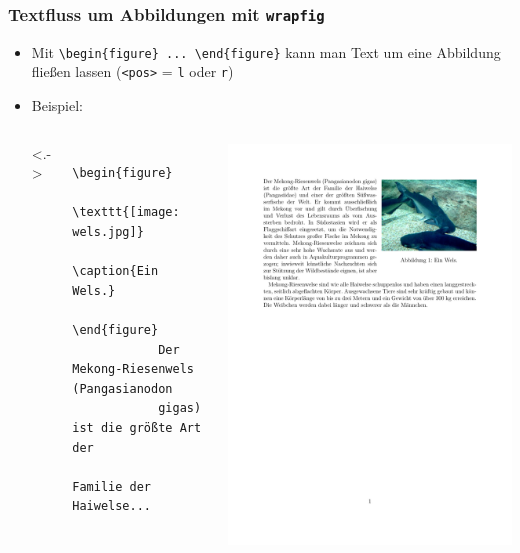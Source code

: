 \begin{frame}[<+->][fragile]
	\frametitle{Textfluss um Abbildungen mit \texttt{wrapfig}}
	
	\begin{itemize}
		\item Mit \lstinline!\begin{figure} ... \end{figure}! kann man Text um eine Abbildung fließen lassen (\lstinline!<pos>! = \lstinline!l! oder \lstinline!r!)
		\item Beispiel:
		\begin{columns}<.->
			\lstset{basicstyle=\footnotesize\ttfamily}
			\hspace{0.5cm}
			\begin{lstlisting}
			\begin{figure}
			    \texttt{[image: wels.jpg]}
			    \caption{Ein Wels.}
			\end{figure}
			Der Mekong-Riesenwels (Pangasianodon
			gigas) ist die größte Art der
			Familie der Haiwelse...
			\end{lstlisting}
			\includegraphics[width=\textwidth, trim=2cm 17cm 2cm 2cm, clip]{res/wrapfig_example.pdf}

\end{columns}
\end{itemize}
\end{frame}
